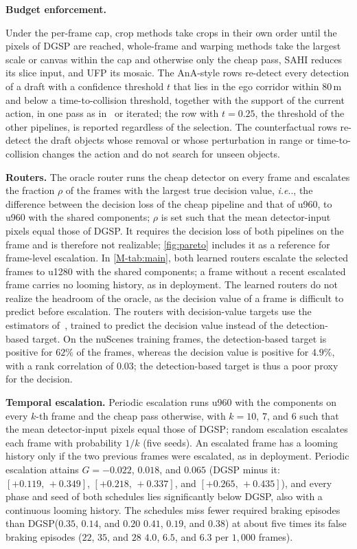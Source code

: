 \documentclass[10pt,letterpaper]{article}
\makeatletter
\DeclareRobustCommand\onedot{\futurelet\@let@token\@onedot}
\def\@onedot{\ifx\@let@token.\else.\null\fi\xspace}
\def\ie{\emph{i.e}\onedot} \def\Ie{\emph{I.e}\onedot}
\newcommand{\method}{DGSP\xspace}
\newcommand{\G}{G}
\newcommand{\ci}[2]{[#1,\allowbreak\,#2]}
\theoremstyle{remark}
\theoremstyle{plain}
\theoremstyle{definition}
\makeatother
\begin{document}
\noindent\textbf{Budget enforcement.}

Under the per-frame cap, crop methods take crops in their own order until the pixels of \method are reached, whole-frame and warping methods take the largest scale or canvas within the cap and otherwise only the cheap pass, SAHI reduces its slice input, and UFP its mosaic.
The AnA-style rows re-detect every detection of a draft with a confidence threshold $t$ that lies in the ego corridor within $80$\,m and below a time-to-collision threshold, together with the support of the current action, in one pass as in~\cite{ana} or iterated; the row with $t=0.25$, the threshold of the other pipelines, is reported regardless of the selection.
The counterfactual rows re-detect the draft objects whose removal or whose perturbation in range or time-to-collision changes the action and do not search for unseen objects.

\noindent\textbf{Routers.}
The oracle router runs the cheap detector on every frame and escalates the fraction $\rho$ of the frames with the largest true decision value, \ie, the difference between the decision loss of the cheap pipeline and that of u960, to u960 with the shared components; $\rho$ is set such that the mean detector-input pixels equal those of \method.
It requires the decision loss of both pipelines on the frame and is therefore not realizable; \cref{fig:pareto} includes it as a reference for frame-level escalation.
In \cref*{M-tab:main}, both learned routers escalate the selected frames to u1280 with the shared components; a frame without a recent escalated frame carries no looming history, as in deployment.
The learned routers do not realize the headroom of the oracle, as the decision value of a frame is difficult to predict before escalation.
The routers with decision-value targets use the estimators of~\cite{bgtada}, trained to predict the decision value instead of the detection-based target.
On the nuScenes training frames, the detection-based target is positive for $62\%$ of the frames, whereas the decision value is positive for $4.9\%$, with a rank correlation of $0.03$; the detection-based target is thus a poor proxy for the decision.

\noindent\textbf{Temporal escalation.}
Periodic escalation runs u960 with the components on every $k$-th frame and the cheap pass otherwise, with $k=10$, $7$, and $6$ such that the mean detector-input pixels equal those of \method; random escalation escalates each frame with probability $1/k$ (five seeds).
An escalated frame has a looming history only if the two previous frames were escalated, as in deployment.
Periodic escalation attains $\G=-0.022$, $0.018$, and $0.065$ (\method minus it: $\ci{+0.119}{+0.349}$, $\ci{+0.218}{+0.337}$, and $\ci{+0.265}{+0.435}$), and every phase and seed of both schedules lies significantly below \method, also with a continuous looming history.
The schedules miss fewer required braking episodes than \method ($0.35$, $0.14$, and $0.20$ \vs $0.41$, $0.19$, and $0.38$) at about five times its false braking episodes ($22$, $35$, and $28$ \vs $4.0$, $6.5$, and $6.3$ per $1{,}000$ frames).
\end{document}
